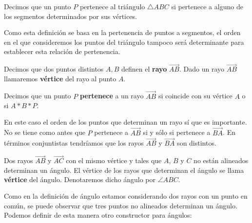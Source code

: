 \begin{defin*}
	Decimos que un punto $P$ pertenece al triángulo $\triangle ABC$ si pertenece
	a alguno de los segmentos determinados por sus vértices.
\end{defin*}


Como esta definición se basa en la pertenencia de puntos a segmentos, el orden
en el que consideremos los puntos del triángulo tampoco será determinante para
establecer esta relación de pertenencia.

\begin{defin*}[Rayos]
	Decimos que dos puntos distintos $A, B$ definen el \textbf{rayo}
	$\overrightarrow{AB}$. Dado un rayo $\overrightarrow{AB}$ llamaremos
	\textbf{vértice} del rayo al punto $A$.
\end{defin*}


\begin{defin*}
	Decimos que un punto $P$ \textbf{pertenece} a un rayo $\overrightarrow{AB}$
	si coincide con su vértice $A$ o si $A * B * P$.
\end{defin*}


En este caso el orden de los puntos que determinan un rayo sí que es importante.
No se tiene como antes que $P$ pertenece a $\overrightarrow{AB}$ si y sólo si
pertenece a $\overrightarrow{BA}$. En términos conjuntistas tendríamos que los
rayos $\overrightarrow{AB}$ y $\overrightarrow{BA}$ son distintos.

\begin{defin*}[Ángulos]
	Dos rayos $\overrightarrow{AB}$ y $\overrightarrow{AC}$ con el mismo vértice
	y tales que $A$, $B$ y $C$ no están alineados determinan un ángulo.
	El vértice de los rayos que determinan el ángulo se llama \textbf{vértice}
	del ángulo. Denotaremos dicho ángulo por $\angle ABC$.
\end{defin*}


Como en la definición de ángulo estamos considerando dos rayos con un punto en
común, se puede observar que tres puntos no alineados determinan un ángulo.
Podemos definir de esta manera otro constructor para ángulos:


